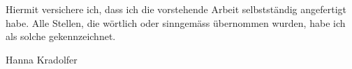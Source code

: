 


Hiermit versichere ich, dass ich die vorstehende Arbeit selbstständig angefertigt habe.
Alle Stellen, die wörtlich oder sinngemäss übernommen wurden, habe ich als solche
gekennzeichnet. 

Hanna Kradolfer


